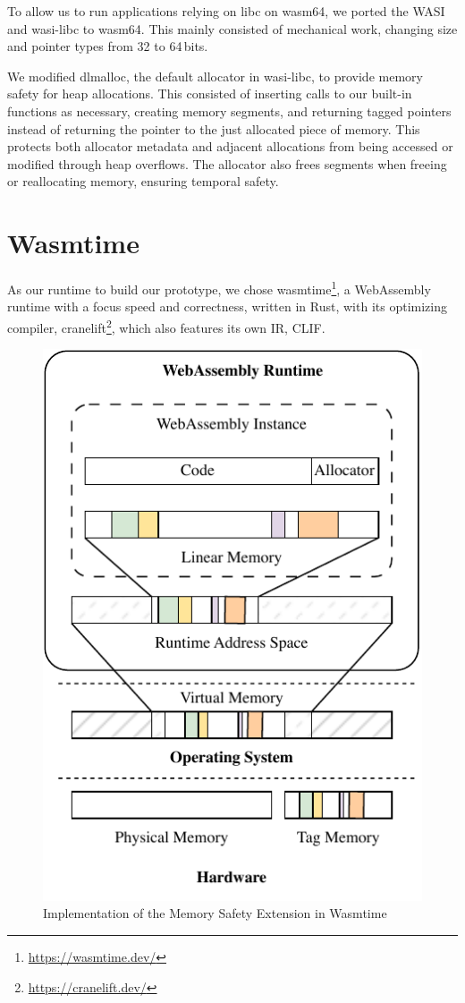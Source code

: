 To allow us to run applications relying on libc on wasm64, we ported the \acf{WASI} and wasi-libc to wasm64.
This mainly consisted of mechanical work, changing size and pointer types from 32 to 64\,bits.

We modified dlmalloc, the default allocator in wasi-libc, to provide memory safety for heap allocations.
This consisted of inserting calls to our built-in functions as necessary, creating memory segments, and returning tagged pointers instead of returning the pointer to the just allocated piece of memory.
This protects both allocator metadata and adjacent allocations from being accessed or modified through heap overflows.
The allocator also frees segments when freeing or reallocating memory, ensuring temporal safety.

\section{Wasmtime}
\label{sec:wasm-runtime}

As our runtime to build our prototype, we chose wasmtime\footnote{\url{https://wasmtime.dev/}}, a WebAssembly runtime with a focus speed and correctness, written in Rust, with its optimizing compiler, cranelift\footnote{\url{https://cranelift.dev/}}, which also features its own \ac{IR}, \ac{CLIF}.

\begin{figure}[t]
  \centering
  \includegraphics[scale=1]{figures/build/system-design-2}
  \caption{Implementation of the Memory Safety Extension in Wasmtime}
  \label{fig:wasmtime-mte-impl}
\end{figure}

